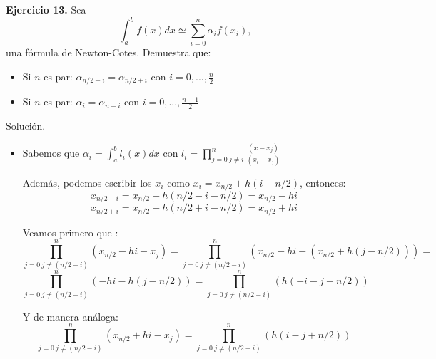 \documentclass[11pt]{article}
\begin{document}
\textbf{Ejercicio 13.} Sea $$ \int_a^b f(x) dx \simeq \sum_{i=0}^n \alpha_i f(x_i),  $$
una fórmula de Newton-Cotes. Demuestra que:

\begin{itemize}
\item Si $n$ es par: $ \alpha_{n/2-i}=\alpha_{n/2+i}$ con $ i = 0,...,\frac{n}{2}$
\item Si $n$ es par: $ \alpha_{i}=\alpha_{n-i}$ con $ i = 0,...,\frac{n-1}{2}$
\end{itemize}

{Solución.\\}

\begin{itemize}
\item Sabemos que $\alpha_{i}=\int_a^b l_i(x) dx $ con $l_i = \prod_{j = 0  \ j\neq i}^n \frac{(x-x_j)}{(x_i-x_j)}$

Además, podemos escribir los $x_i$ como $x_i= x_{n/2} + h(i-n/2)$, entonces:   $$x_{n/2-i}  = x_{n/2} + h(n/2-i-n/2)   = x_{n/2} - hi $$ 
$$x_{n/2+i} = x_{n/2} + h(n/2+i-n/2) = x_ {n/2} + hi $$

Veamos primero que :
$$ \prod_{j = 0  \ j\neq (n/2-i)}^n (x_{n/2} - hi -x_j) =  \prod_{j = 0  \ j\neq (n/2-i)}^n   (x_{n/2} - hi -   (x_{n/2} + h(j-n/2) )) = $$ $$  \prod_{j = 0  \ j\neq (n/2-i)}^n   (- hi -    h(j-n/2) ) =
  \prod_{j = 0  \ j\neq (n/2-i)}^n    ( h (-i - j+n/2) ) $$

Y de manera análoga:
$$ \prod_{j = 0  \ j\neq (n/2-i)}^n (x_{n/2} + hi -x_j) =   \prod_{j = 0  \ j\neq (n/2-i)}^n   (  h(i - j+n/2 ))$$


\end{itemize}
\end{document}
